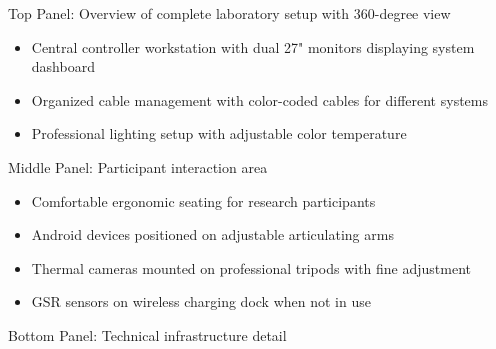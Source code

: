 \documentclass[11pt,a4paper]{report}
\begin{document}
Top Panel: Overview of complete laboratory setup with 360-degree view
\begin{itemize}
\item Central controller workstation with dual 27" monitors displaying system dashboard
\item Organized cable management with color-coded cables for different systems
\item Professional lighting setup with adjustable color temperature

\end{itemize}
Middle Panel: Participant interaction area
\begin{itemize}
\item Comfortable ergonomic seating for research participants
\item Android devices positioned on adjustable articulating arms
\item Thermal cameras mounted on professional tripods with fine adjustment
\item GSR sensors on wireless charging dock when not in use

\end{itemize}
Bottom Panel: Technical infrastructure detail
\end{document}
